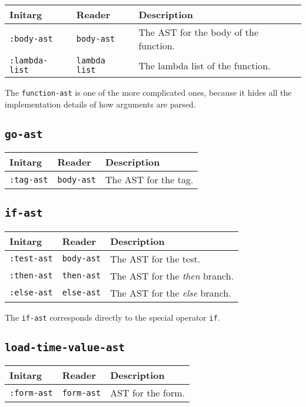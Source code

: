 \begin{tabular}{|l|l|l|}
\hline
Initarg & Reader & Description\\
\hline\hline
\texttt{:body-ast} & \texttt{body-ast} & The AST for the body of the function.\\
\hline
\texttt{:lambda-list} & \texttt{lambda list} & The lambda list of the function.\\
\hline
\end{tabular}

The \texttt{function-ast} is one of the more complicated ones, because
it hides all the implementation details of how arguments are parsed. 

\subsection{\texttt{go-ast}}
\label{go-ast}

\begin{tabular}{|l|l|l|}
\hline
Initarg & Reader & Description\\
\hline\hline
\texttt{:tag-ast} & \texttt{body-ast} & The AST for the tag.\\
\hline
\end{tabular}

\subsection{\texttt{if-ast}}
\label{if-ast}

\begin{tabular}{|l|l|l|}
\hline
Initarg & Reader & Description\\
\hline\hline
\texttt{:test-ast} & \texttt{body-ast} & The AST for the test.\\
\hline
\texttt{:then-ast} & \texttt{then-ast} & The AST for the \emph{then} branch.\\
\hline
\texttt{:else-ast} & \texttt{else-ast} & The AST for the \emph{else} branch.\\
\hline
\end{tabular}

The \texttt{if-ast} corresponds directly to the \cl{} special operator
\texttt{if}. 

\subsection{\texttt{load-time-value-ast}}
\label{load-time-value-ast}

\begin{tabular}{|l|l|l|}
\hline
Initarg & Reader & Description\\
\hline\hline
\texttt{:form-ast} & \texttt{form-ast} & AST for the form.\\
\hline
\end{tabular}

